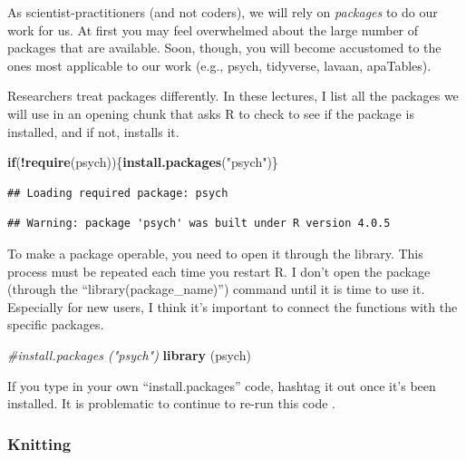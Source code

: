 \documentclass[
  english,
]{book}
\newenvironment{Shaded}{\begin{snugshade}}{\end{snugshade}}
\newcommand{\CommentTok}[1]{\textcolor[rgb]{0.56,0.35,0.01}{\textit{#1}}}
\newcommand{\ControlFlowTok}[1]{\textcolor[rgb]{0.13,0.29,0.53}{\textbf{#1}}}
\newcommand{\KeywordTok}[1]{\textcolor[rgb]{0.13,0.29,0.53}{\textbf{#1}}}
\newcommand{\NormalTok}[1]{#1}
\newcommand{\OperatorTok}[1]{\textcolor[rgb]{0.81,0.36,0.00}{\textbf{#1}}}
\newcommand{\StringTok}[1]{\textcolor[rgb]{0.31,0.60,0.02}{#1}}
\begin{document}
As scientist-practitioners (and not coders), we will rely on \emph{packages} to do our work for us. At first you may feel overwhelmed about the large number of packages that are available. Soon, though, you will become accustomed to the ones most applicable to our work (e.g., psych, tidyverse, lavaan, apaTables).

Researchers treat packages differently. In these lectures, I list all the packages we will use in an opening chunk that asks R to check to see if the package is installed, and if not, installs it.

\begin{Shaded}
\begin{Highlighting}[]
\ControlFlowTok{if}\NormalTok{(}\OperatorTok{!}\KeywordTok{require}\NormalTok{(psych))\{}\KeywordTok{install.packages}\NormalTok{(}\StringTok{"psych"}\NormalTok{)\}}
\end{Highlighting}
\end{Shaded}

\begin{verbatim}
## Loading required package: psych
\end{verbatim}

\begin{verbatim}
## Warning: package 'psych' was built under R version 4.0.5
\end{verbatim}

To make a package operable, you need to open it through the library. This process must be repeated each time you restart R. I don't open the package (through the ``library(package\_name)'') command until it is time to use it. Especially for new users, I think it's important to connect the functions with the specific packages.

\begin{Shaded}
\begin{Highlighting}[]
\CommentTok{#install.packages ("psych")}
\KeywordTok{library}\NormalTok{ (psych)}
\end{Highlighting}
\end{Shaded}

If you type in your own ``install.packages'' code, hashtag it out once it's been installed. It is problematic to continue to re-run this code .

\hypertarget{knitting}{%
\subsubsection{Knitting}\label{knitting}}
\end{document}
